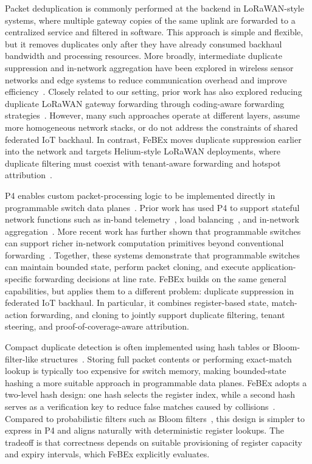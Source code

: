Packet deduplication is commonly performed at the backend in LoRaWAN-style systems, where multiple gateway copies of the same uplink are forwarded to a centralized service and filtered in software. This approach is simple and flexible, but it removes duplicates only after they have already consumed backhaul bandwidth and processing resources. More broadly, intermediate duplicate suppression and in-network aggregation have been explored in wireless sensor networks and edge systems to reduce communication overhead and improve efficiency~\cite{tada}. Closely related to our setting, prior work has also explored reducing duplicate LoRaWAN gateway forwarding through coding-aware forwarding strategies~\cite{alawami_lorawan_forwarding22}. However, many such approaches operate at different layers, assume more homogeneous network stacks, or do not address the constraints of shared federated IoT backhaul. In contrast, FeBEx moves duplicate suppression earlier into the network and targets Helium-style LoRaWAN deployments, where duplicate filtering must coexist with tenant-aware forwarding and hotspot attribution~\cite{tada,alawami_lorawan_forwarding22}.

P4 enables custom packet-processing logic to be implemented directly in programmable switch data planes~\cite{p4}. Prior work has used P4 to support stateful network functions such as in-band telemetry~\cite{int}, load balancing~\cite{conga}, and in-network aggregation~\cite{netcache}. More recent work has further shown that programmable switches can support richer in-network computation primitives beyond conventional forwarding~\cite{chen_p4com21}. Together, these systems demonstrate that programmable switches can maintain bounded state, perform packet cloning, and execute application-specific forwarding decisions at line rate. FeBEx builds on the same general capabilities, but applies them to a different problem: duplicate suppression in federated IoT backhaul. In particular, it combines register-based state, match-action forwarding, and cloning to jointly support duplicate filtering, tenant steering, and proof-of-coverage-aware attribution.

Compact duplicate detection is often implemented using hash tables or Bloom-filter-like structures~\cite{hashtables,bloomfilters}. Storing full packet contents or performing exact-match lookup is typically too expensive for switch memory, making bounded-state hashing a more suitable approach in programmable data planes. FeBEx adopts a two-level hash design: one hash selects the register index, while a second hash serves as a verification key to reduce false matches caused by collisions~\cite{hashtables}. Compared to probabilistic filters such as Bloom filters~\cite{bloomfilters}, this design is simpler to express in P4 and aligns naturally with deterministic register lookups. The tradeoff is that correctness depends on suitable provisioning of register capacity and expiry intervals, which FeBEx explicitly evaluates.

